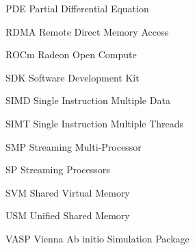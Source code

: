 \begin{abbrv}
\item[PDE]                   Partial Differential Equation
\item[RDMA]                  Remote Direct Memory Access
\item[ROCm]                  Radeon Open Compute
\item[SDK]                   Software Development Kit
\item[SIMD]                  Single Instruction Multiple Data
\item[SIMT]                  Single Instruction Multiple Threads
\item[SMP]                   Streaming Multi-Processor
\item[SP]                    Streaming Processors
\item[SVM]                   Shared Virtual Memory
\item[USM]                   Unified Shared Memory
\item[VASP]                  Vienna Ab initio Simulation Package
\end{abbrv}
